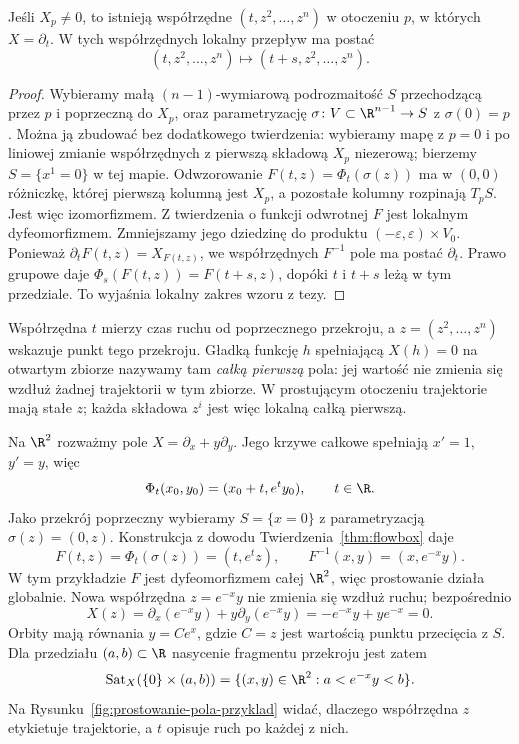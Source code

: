 \begin{twierdzenie}\label{thm:flowbox}
Jeśli $X_p\ne0$, to istnieją współrzędne $(t,z^2,\ldots,z^n)$
w otoczeniu $p$, w których $X=\partial_t$. W tych współrzędnych
lokalny przepływ ma postać
\[
 (t,z^2,\ldots,z^n)\longmapsto(t+s,z^2,\ldots,z^n).
\]
\end{twierdzenie}
\begin{proof}
Wybieramy małą $(n-1)$-wymiarową podrozmaitość $S$
przechodzącą przez $p$ i poprzeczną do $X_p$, oraz parametryzację
$\sigma\colon V\subset\R^{n-1}\to S$ z $\sigma(0)=p$.
Można ją zbudować bez dodatkowego twierdzenia: wybieramy mapę
z $p=0$ i po liniowej zmianie współrzędnych z pierwszą składową
$X_p$ niezerową; bierzemy $S=\{x^1=0\}$ w tej mapie.
Odwzorowanie $F(t,z)=\Phi_t(\sigma(z))$ ma w $(0,0)$
różniczkę, której pierwszą kolumną jest $X_p$, a pozostałe kolumny
rozpinają $T_pS$. Jest więc izomorfizmem. Z twierdzenia o funkcji
odwrotnej $F$ jest lokalnym dyfeomorfizmem. Zmniejszamy jego
dziedzinę do produktu $(-\varepsilon,\varepsilon)\times V_0$.
Ponieważ $\partial_tF(t,z)=X_{F(t,z)}$, we współrzędnych $F^{-1}$
pole ma postać $\partial_t$. Prawo grupowe daje
$\Phi_s(F(t,z))=F(t+s,z)$, dopóki $t$ i $t+s$ leżą
w tym przedziale. To wyjaśnia lokalny zakres wzoru z tezy.
\end{proof}

Współrzędna $t$ mierzy czas ruchu od poprzecznego przekroju,
a $z=(z^2,\ldots,z^n)$ wskazuje punkt tego przekroju.
Gładką funkcję $h$ spełniającą $X(h)=0$ na otwartym zbiorze
nazywamy tam \emph{całką pierwszą} pola: jej wartość nie zmienia się
wzdłuż żadnej trajektorii w tym zbiorze.
W prostującym otoczeniu trajektorie mają stałe $z$;
każda składowa $z^i$ jest więc lokalną całką pierwszą.

\begin{przyklad}
Na $\R^2$ rozważmy pole
$X=\partial_x+y\partial_y$.
Jego krzywe całkowe spełniają $x'=1$, $y'=y$, więc
\[
\Phi_t(x_0,y_0)=(x_0+t,e^t y_0),
\qquad t\in\R.
\]
Jako przekrój poprzeczny wybieramy $S=\{x=0\}$ z
parametryzacją $\sigma(z)=(0,z)$.
Konstrukcja z dowodu Twierdzenia~\ref{thm:flowbox} daje
\[
F(t,z)=\Phi_t(\sigma(z))=(t,e^t z),
\qquad F^{-1}(x,y)=(x,e^{-x}y).
\]
W tym przykładzie $F$ jest dyfeomorfizmem całej $\R^2$,
więc prostowanie działa globalnie. Nowa współrzędna
$z=e^{-x}y$ nie zmienia się wzdłuż ruchu; bezpośrednio
\[
X(z)=\partial_x(e^{-x}y)+y\partial_y(e^{-x}y)
=-e^{-x}y+ye^{-x}=0.
\]
Orbity mają równania $y=Ce^x$, gdzie $C=z$ jest wartością
punktu przecięcia z $S$. Dla przedziału $(a,b)\subset\R$
nasycenie fragmentu przekroju jest zatem
\[
\operatorname{Sat}_X(\{0\}\times(a,b))
=\{(x,y)\in\R^2:a<e^{-x}y<b\}.
\]
Na Rysunku~\ref{fig:prostowanie-pola-przyklad} widać,
dlaczego współrzędna $z$ etykietuje trajektorie, a $t$
opisuje ruch po każdej z nich.
\end{przyklad}

